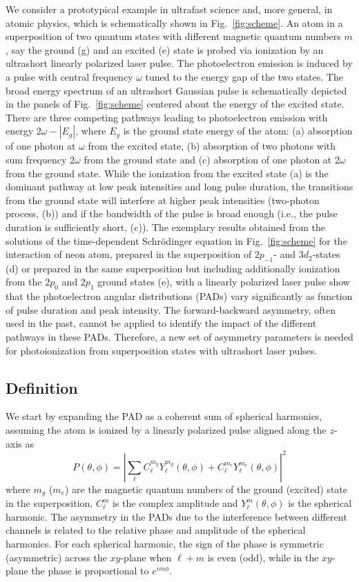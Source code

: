 We consider a prototypical example in ultrafast science and, more general, in atomic physics, which is schematically shown in Fig.~\ref{fig:scheme}. 
An atom in a superposition of two quantum states with different magnetic quantum numbers $m$, say the ground (g) and an excited (e) state is probed via ionization by an ultrashort linearly polarized laser pulse. The photoelectron emission is induced by a pulse with central frequency $\omega$ tuned to the energy gap of the two states. The broad energy spectrum of an ultrashort Gaussian pulse is schematically depicted in the panels of Fig.~\ref{fig:scheme} centered about the energy of the excited state. There are three competing pathways leading to photoelectron emission with energy $2\omega - |E_g|$, where $E_g$ is the ground state energy of the atom: (a) absorption of one photon at $\omega$ from the
excited state, (b) absorption of two photons with sum frequency $2\omega$ from the 
ground state and (c) absorption of one photon at $2\omega$ from the ground state. While the ionization from the excited state (a) is the dominant pathway at low peak intensities and long pulse duration, the transitions from the ground state will interfere at higher peak intensities (two-photon process, (b)) and if the bandwidth of the pulse is broad enough (i.e., the pulse duration is sufficiently short, (c)). 
The exemplary results obtained from the solutions of the time-dependent Schr\"odinger equation in Fig.\ \ref{fig:scheme} for the interaction of
neon atom, prepared in the superposition of $2p_{-1}$- and $3d_2$-states (d) or prepared in the same superposition but including additionally ionization from the $2p_0$ and $2p_1$ ground states (e), with a linearly polarized laser pulse show that the photoelectron angular distributions (PADs) vary significantly as function of pulse duration and peak intensity. 
The forward-backward asymmetry, often used in the past, cannot be applied to
identify the impact of the different pathways in these PADs. Therefore, a new set of asymmetry parameters is needed for photoionization from superposition states with ultrashort laser pulses.

\subsection*{Definition}

We start by expanding the PAD as a coherent sum of spherical harmonics, assuming 
the atom is ionized by a linearly polarized pulse aligned along the $z$-axis as
\begin{equation}
    P(\theta,\phi) = \left|\sum_\ell C_{\ell}^{m_g} Y_\ell^{m_g}(\theta,\phi)+C_{\ell}^{m_e} Y_\ell^{m_e}(\theta,\phi)\right|^2
\end{equation}
where $m_g$ ($m_e$) are the magnetic quantum numbers of the ground (excited) state in the superposition, $C_\ell^m$ is the complex amplitude and $Y_\ell^m(\theta,\phi)$ is the spherical harmonic. The asymmetry in the PADs due to the interference between different channels is related to the relative phase and amplitude of the spherical harmonics. For each spherical harmonic, the sign of the phase is symmetric (asymmetric) across the $xy$-plane when $\ell+m$ is even (odd), while
in the $xy$-plane 
the phase is proportional to $e^{im\phi}$. 

